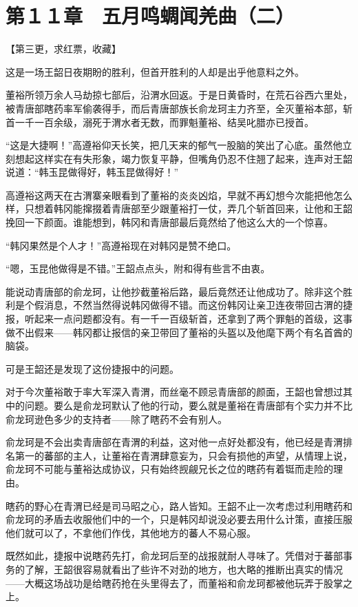 \section{第１１章　五月鸣蜩闻羌曲（二）}

【第三更，求红票，收藏】

这是一场王韶日夜期盼的胜利，但首开胜利的人却是出乎他意料之外。

董裕所领万余人马劫掠七部后，沿渭水回返。于是日黄昏时，在荒石谷西六里处，被青唐部瞎药率军偷袭得手，而后青唐部族长俞龙珂主力齐至，全灭董裕本部，斩首一千一百余级，溺死于渭水者无数，而罪魁董裕、结吴叱腊亦已授首。

“这是大捷啊！”高遵裕仰天长笑，把几天来的郁气一股脑的笑出了心底。虽然他立刻想起这样实在有失形象，竭力恢复平静，但嘴角仍忍不住翘了起来，连声对王韶说道：“韩玉昆做得好，韩玉昆做得好！”

高遵裕这两天在古渭寨亲眼看到了董裕的炎炎凶焰，早就不再幻想今次能把他怎么样，只想着韩冈能撺掇着青唐部至少跟董裕打一仗，弄几个斩首回来，让他和王韶挽回一下颜面。谁能想到，韩冈和青唐部最后竟然给了他这么大的一个惊喜。

“韩冈果然是个人才！”高遵裕现在对韩冈是赞不绝口。

“嗯，玉昆他做得是不错。”王韶点点头，附和得有些言不由衷。

能说动青唐部的俞龙珂，让他抄截董裕后路，最后竟然还让他成功了。除非这个胜利是个假消息，不然当然得说韩冈做得不错。而这份韩冈让亲卫连夜带回古渭的捷报，听起来一点问题都没有。有一千一百级斩首，还拿到了两个罪魁的首级，这事做不出假来——韩冈都让报信的亲卫带回了董裕的头盔以及他麾下两个有名首酋的脑袋。

可是王韶还是发现了这份捷报中的问题。

对于今次董裕敢于率大军深入青渭，而丝毫不顾忌青唐部的颜面，王韶也曾想过其中的问题。要么是俞龙珂默认了他的行动，要么就是董裕在青唐部有个实力并不比俞龙珂逊色多少的支持者——除了瞎药不会有别人。

俞龙珂是不会出卖青唐部在青渭的利益，这对他一点好处都没有，他已经是青渭排名第一的蕃部的主人，让董裕在青渭肆意妄为，只会有损他的声望，从情理上说，俞龙珂不可能与董裕达成协议，只有始终觊觎兄长之位的瞎药有着铤而走险的理由。

瞎药的野心在青渭已经是司马昭之心，路人皆知。王韶不止一次考虑过利用瞎药和俞龙珂的矛盾去收服他们中的一个，只是韩冈却说没必要去用什么计策，直接压服他们就可以了，不拿他们作伐，其他地方的蕃人不易心服。

既然如此，捷报中说瞎药先打，俞龙珂后至的战报就耐人寻味了。凭借对于蕃部事务的了解，王韶很容易就看出了些许不对劲的地方，也大略的推断出真实的情况——大概这场战功是给瞎药抢在头里得去了，而董裕和俞龙珂都被他玩弄于股掌之上。

